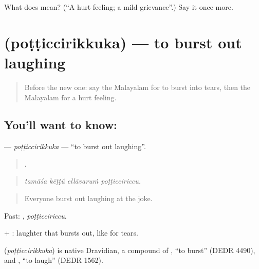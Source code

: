 \begin{tcolorbox}[breakable,colback=teal!4,colframe=teal!35!black,title={Before you move on}]
What does  mean? (\textquotedblleft{}A hurt feeling; a mild grievance\textquotedblright{}.) Say it once more.
\end{tcolorbox}
\section[\texorpdfstring{\ml{പൊട്ടിച്ചിരിക്കുക} (poṭṭiccirikkuka)}{പൊട്ടിച്ചിരിക്കുക (poṭṭiccirikkuka)}]{ (poṭṭiccirikkuka) — to burst out laughing}

\label{lesson:ML-C525-potticcirikkuka}



\begin{quote}
Before the new one: say the Malayalam for to burst into tears, then the Malayalam for a hurt feeling.
\end{quote}

\subsection*{You'll want to know: }
\textbf{} — \emph{poṭṭiccirikkuka} — \textquotedblleft{}to burst out laughing\textquotedblright{}.

\begin{quote}
   .
\end{quote}

\begin{quote}
\emph{tamāśa kēṭṭŭ ellāvaruṁ poṭṭicciriccu.}
\end{quote}

\begin{quote}
Everyone burst out laughing at the joke.
\end{quote}

Past: , \emph{poṭṭicciriccu}.

 + : laughter that bursts out, like  for tears.

\begin{cousinweb}
\textbf{} (\emph{poṭṭiccirikkuka}) is native Dravidian, a compound of , \textquotedblleft{}to burst\textquotedblright{} (DEDR 4490), and , \textquotedblleft{}to laugh\textquotedblright{} (DEDR 1562).
\end{cousinweb}

